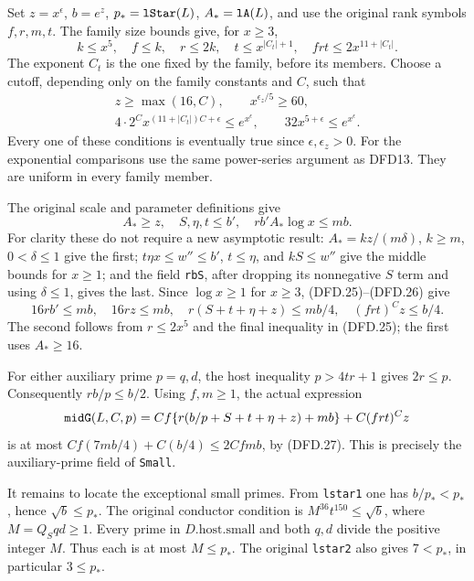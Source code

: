 Set $z=x^\epsilon$, $b=e^z$, $p_*=\texttt{l\allowbreak Star}(L)$,
$A_*=\texttt{l\allowbreak A}(L)$, and use the original rank symbols
$f,r,m,t$. The family size bounds give, for $x\ge3$,
\[
 k\le x^5,\quad f\le k,\quad r\le2k,
 \quad t\le x^{|C_t|+1},\quad
 frt\le2x^{11+|C_t|}.                                  \tag{DFD.24}
\]
The exponent $C_t$ is the one fixed by the family, before
its members. Choose a cutoff, depending only on the
family constants and $C$, such that
\[
 \begin{gathered}
 z\ge\max(16,C),\qquad x^{\epsilon_z/5}\ge60,\\
 4\cdot2^C x^{(11+|C_t|)C+\epsilon}\le e^{x^\epsilon},
 \qquad32x^{5+\epsilon}\le e^{x^\epsilon}.
 \end{gathered}                                         \tag{DFD.25}
\]
Every one of these conditions is eventually true since
$\epsilon,\epsilon_z>0$. For the exponential comparisons
use the same power-series argument as DFD13. They are
uniform in every family member.

The original scale and parameter definitions give
\[
 A_*\ge z,\quad S,\eta,t\le b',\quad
             rb'A_*\log x\le mb.                       \tag{DFD.26}
\]
For clarity these do not require a new asymptotic result:
$A_*=kz/(m\delta)$, $k\ge m$, $0<\delta\le1$ give the
first; $t\eta x\le w''\le b'$, $t\le\eta$, and
$kS\le w''$ give the middle bounds for $x\ge1$; and
the field \texttt{rb\allowbreak S}, after dropping its nonnegative
$S$ term and using $\delta\le1$, gives the last.
Since $\log x\ge1$ for $x\ge3$, (DFD.25)--(DFD.26)
give
\[
 16rb'\le mb,\quad16rz\le mb,\quad
 r(S+t+\eta+z)\le mb/4,\quad(frt)^Cz\le b/4.            \tag{DFD.27}
\]
The second follows from $r\le2x^5$ and the final
inequality in (DFD.25); the first uses $A_*\ge16$.

For either auxiliary prime $p=q,d$, the host inequality
$p>4tr+1$ gives $2r\le p$. Consequently $rb/p\le b/2$.
Using $f,m\ge1$, the actual expression
\[
 \texttt{mid\allowbreak G}(L,C,p)
   =Cf\{r(b/p+S+t+\eta+z)+mb\}+C(frt)^Cz
\]
is at most
$Cf(7mb/4)+C(b/4)\le2Cfmb$, by (DFD.27).
This is precisely the auxiliary-prime field of
\texttt{Small}.

It remains to locate the exceptional small primes. From
\texttt{lstar1} one has $b/p_*<p_*$, hence
$\sqrt b\le p_*$. The original conductor condition is
$M^{36}t^{150}\le\sqrt b$, where $M=Q_Sqd\ge1$.
Every prime in $D.\mathrm{host}.\mathrm{small}$ and
both $q,d$ divide the positive integer $M$. Thus each
is at most $M\le p_*$. The original \texttt{lstar2}
also gives $7<p_*$, in particular $3\le p_*$.

